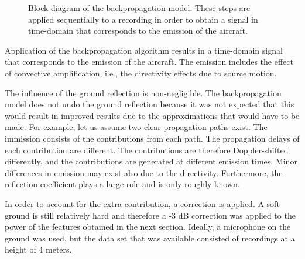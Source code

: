 \begin{figure}[H]
  \centering
{}
  \caption{Block diagram of the backpropagation model. These steps are applied sequentially to a recording in order to obtain a signal in time-domain that corresponds to the emission of the aircraft.}
  \label{fig:backpropagation_block_diagram}
\end{figure}

Application of the backpropagation algorithm results in a time-domain signal
that corresponds to the emission of the aircraft. The emission includes the
effect of convective amplification, i.e., the directivity effects due to source
motion.

The influence of the ground reflection is non-negligible. The backpropagation
model does not undo the ground reflection because it was not expected that this
would result in improved results due to the approximations that would have to be
made. For example, let us assume two clear propagation paths exist. The
immission consists of the contributions from each path. The propagation delays
of each contribution are different. The contributions are therefore
Doppler-shifted differently, and the contributions are generated at different
emission times. Minor differences in emission may exist also due to the
directivity. Furthermore, the reflection coefficient plays a large role and is
only roughly known.

In order to account for the extra contribution, a correction is applied. A soft
ground is still relatively hard and therefore a -3 dB correction was applied to
the power of the features obtained in the next section. Ideally, a microphone on
the ground was used, but the data set that was available consisted of recordings
at a height of 4 meters.

